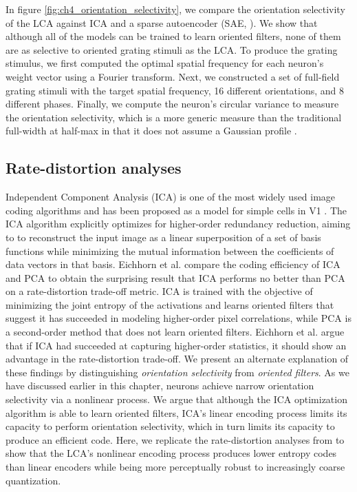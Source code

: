 In figure \ref{fig:ch4_orientation_selectivity}, we compare the orientation selectivity of the LCA against ICA and a sparse autoencoder (SAE, \cite{ng2011sparse}).
We show that although all of the models can be trained to learn oriented filters, none of them are as selective to oriented grating stimuli as the LCA.
To produce the grating stimulus, we first computed the optimal spatial frequency for each neuron's weight vector using a Fourier transform.
Next, we constructed a set of full-field grating stimuli with the target spatial frequency, 16 different orientations, and 8 different phases.
Finally, we compute the neuron's circular variance to measure the orientation selectivity, which is a more generic measure than the traditional full-width at half-max in that it does not assume a Gaussian profile \parencite{ringach2002orientation}.

\subsection{Rate-distortion analyses}
Independent Component Analysis (ICA) is one of the most widely used image coding algorithms and has been proposed as a model for simple cells in V1 \parencite{bell1997independent, hyvarinen1999fast}.
The ICA algorithm explicitly optimizes for higher-order redundancy reduction, aiming to to reconstruct the input image as a linear superposition of a set of basis functions while minimizing the mutual information between the coefficients of data vectors in that basis.
Eichhorn et al. \citeyearpar{eichhorn2009natural} compare the coding efficiency of ICA and PCA to obtain the surprising result that ICA performs no better than PCA on a rate-distortion trade-off metric.
ICA is trained with the objective of minimizing the joint entropy of the activations and learns oriented filters that suggest it has succeeded in modeling higher-order pixel correlations, while PCA is a second-order method that does not learn oriented filters.
Eichhorn et al. \citeyearpar{eichhorn2009natural} argue that if ICA had succeeded at capturing higher-order statistics, it should show an advantage in the rate-distortion trade-off.
We present an alternate explanation of these findings by distinguishing \textit{orientation selectivity} from \textit{oriented filters}.
As we have discussed earlier in this chapter, neurons achieve narrow orientation selectivity via a nonlinear process.
We argue that although the ICA optimization algorithm is able to learn oriented filters, ICA's linear encoding process limits its capacity to perform orientation selectivity, which in turn limits its capacity to produce an efficient code.
Here, we replicate the rate-distortion analyses from \parencite{eichhorn2009natural} to show that the LCA's nonlinear encoding process produces lower entropy codes than linear encoders while being more perceptually robust to increasingly coarse quantization.

